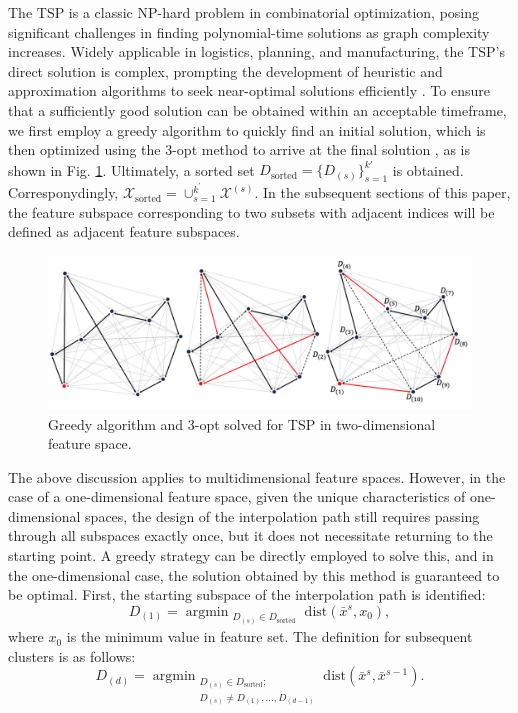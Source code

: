 \documentclass[final,3p,times]{elsarticle}
\begin{document}
The TSP is a classic NP-hard problem 
in combinatorial optimization, posing significant challenges in 
finding polynomial-time solutions as graph complexity increases. 
Widely applicable in logistics, planning, and manufacturing, 
the TSP's direct solution is complex, prompting the development 
of heuristic and approximation algorithms to seek near-optimal 
solutions efficiently \cite{bib57}. To ensure that a sufficiently good 
solution can be obtained within an acceptable timeframe, we first 
employ a greedy algorithm to quickly find an initial solution, 
which is then optimized using the 3-opt method to arrive at the 
final solution \cite{bib64}, as is shown 
in Fig. \ref{Fig4}. Ultimately, a sorted set 
$D_\text{sorted}=\{D_{(s)}\}_{s=1}^{k'}$ is obtained. Corresponydingly, $\mathcal{X}_{\text{sorted}}=\cup_{s=1}^{k^\prime}\mathcal{X}^{(s)}$. In the subsequent sections of this paper, the feature 
subspace corresponding to two subsets with adjacent indices will be 
defined as adjacent feature subspaces.

\begin{figure}[h!]
  \centering
  \includegraphics[scale=0.3]{Fig4.png}
  \caption{Greedy algorithm and 3-opt solved for TSP in 
  two-dimensional feature space.}
  \label{Fig4}
\end{figure}

The above discussion applies to multidimensional feature spaces. 
However, in the case of a one-dimensional feature space, given 
the unique characteristics of one-dimensional spaces, the design 
of the interpolation path still requires passing through all 
subspaces exactly once, but it does not necessitate returning to 
the starting point. A greedy strategy can be directly employed to 
solve this, and in the one-dimensional case, the solution obtained 
by this method is guaranteed to be optimal. First, the starting 
subspace of the interpolation path is identified:
\begin{equation}
\label{eq3}
D_{(1)}=\mathop{\text{argmin}}_{\substack{D_{(s)}\in D_{\text{sorted}}}}
\text{dist}({\bar{x}}^s,{x}_0), 
\end{equation}
where $x_0$ is the minimum value in feature set. The definition 
for subsequent clusters is as follows:
\begin{equation}
\label{eq4}
D_{(d)} = \mathop{\text{argmin}}_{\substack{D_{(s)} \in D_{\text{sorted}}; \\ 
D_{(s)} \neq D_{(1)}, \ldots, D_{(d-1)}}}\text{dist}\left(\bar{x}^s, 
\bar{x}^{s-1}\right).
\end{equation}
\end{document}
